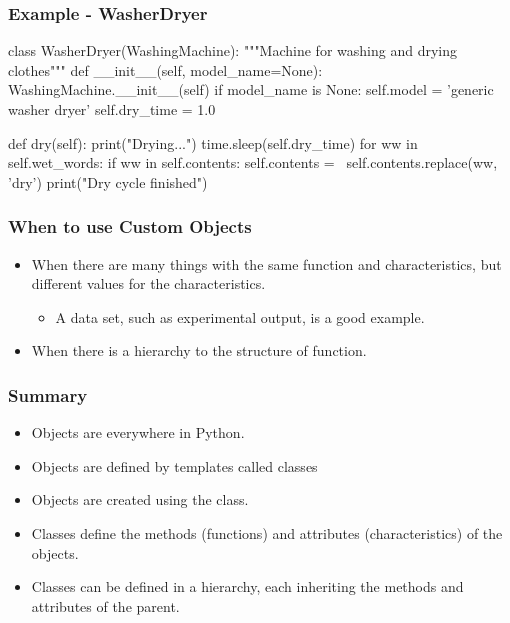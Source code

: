 \documentclass{beamer}
\begin{document}
\begin{frame}[fragile]
\frametitle{Example - WasherDryer}
\begin{code}
class WasherDryer(WashingMachine):
    """Machine for washing and drying clothes"""
    def __init__(self, model_name=None):
        WashingMachine.__init__(self)
        if model_name is None:
          self.model = 'generic washer dryer'
        self.dry_time = 1.0

    def dry(self):
        print("Drying...")
        time.sleep(self.dry_time)
        for ww in self.wet_words:
            if ww in self.contents:
                self.contents = \
                       self.contents.replace(ww, 'dry')
        print("Dry cycle finished")
        
\end{code}

\end{frame}

\begin{frame}[fragile]
\frametitle{When to use Custom Objects}
\begin{itemize}
\item When there are many things with the same function and characteristics,
but different values for the characteristics.
\begin{itemize}
\item A data set, such as experimental output, is a good example.
\end{itemize}
\item When there is a hierarchy to the structure of function.
\end{itemize}

\end{frame}

\begin{frame}[fragile]
\frametitle{Summary}
\begin{itemize}
\item Objects are everywhere in Python.
\item Objects are defined by templates called classes
\item Objects are created using the class.
\item Classes define the methods (functions) and attributes (characteristics) of the objects.
\item Classes can be defined in a hierarchy, each inheriting the methods and attributes of the parent.
\end{itemize}


\end{frame}
\end{document}
